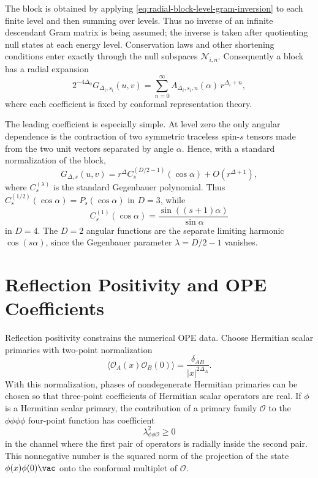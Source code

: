 The block is obtained by applying
\eqref{eq:radial-block-level-gram-inversion} to each finite level and then
summing over levels.  Thus no inverse of an infinite descendant Gram matrix is
being assumed; the inverse is taken after quotienting null states at each
energy level.  Conservation laws and other shortening conditions enter exactly
through the null subspaces \(\mathcal N_{i,n}\).  Consequently a block has a
radial expansion
\begin{equation}
  2^{-4\Delta_\phi}
  G_{\Delta_i,s_i}(u,v)
  =
  \sum_{n=0}^{\infty}
  A_{\Delta_i,s_i,n}(\alpha)\,r^{\Delta_i+n},
  \label{eq:block-radial-expansion}
\end{equation}
where each coefficient is fixed by conformal representation theory.

The leading coefficient is especially simple.  At level zero the only angular
dependence is the contraction of two symmetric traceless spin-\(s\) tensors
made from the two unit vectors separated by angle \(\alpha\).  Hence, with a
standard normalization of the block,
\begin{equation}
  G_{\Delta,s}(u,v)
  =
  r^\Delta
  C_s^{(D/2-1)}(\cos\alpha)
  +
  O(r^{\Delta+1}),
  \label{eq:block-leading-gegenbauer}
\end{equation}
where \(C_s^{(\lambda)}\) is the standard Gegenbauer polynomial.  Thus
\(C_s^{(1/2)}(\cos\alpha)=P_s(\cos\alpha)\) in \(D=3\), while
\[
  C_s^{(1)}(\cos\alpha)
  =
  \frac{\sin((s+1)\alpha)}{\sin\alpha}
\]
in \(D=4\).  The \(D=2\) angular functions are the separate limiting harmonic
\(\cos(s\alpha)\), since the Gegenbauer parameter \(\lambda=D/2-1\) vanishes.

\section{Reflection Positivity and OPE Coefficients}

Reflection positivity constrains the numerical OPE data.  Choose Hermitian
scalar primaries with two-point normalization
\[
  \langle \mathcal O_A(x)\mathcal O_B(0)\rangle
  =
  \frac{\delta_{AB}}{|x|^{2\Delta_A}} .
\]
With this normalization, phases of nondegenerate Hermitian primaries can be
chosen so that three-point coefficients of Hermitian scalar operators are
real.  If \(\phi\) is a Hermitian scalar primary, the contribution of a
primary family \(\mathcal O\) to the \(\phi\phi\phi\phi\) four-point function
has coefficient
\[
  \lambda_{\phi\phi\mathcal O}^2
  \ge0
\]
in the channel where the first pair of operators is radially inside the
second pair.  This nonnegative number is the squared norm of the projection of
the state \(\phi(x)\phi(0)\vac\) onto the conformal multiplet of
\(\mathcal O\).

